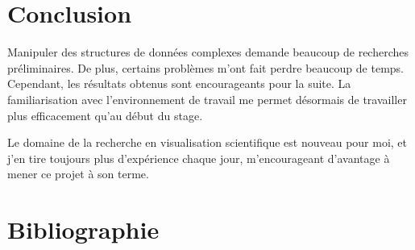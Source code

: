 \documentclass[12pt,a4paper,twoside]{article}
\begin{document}
    \section{Conclusion}                            %

    Manipuler des structures de données complexes demande beaucoup de recherches préliminaires. De plus, certains
    problèmes m'ont fait perdre beaucoup de temps.\\
    Cependant, les résultats obtenus sont encourageants pour la suite. La familiarisation avec l'environnement de travail
    me permet désormais de travailler plus efficacement qu'au début du stage.

    Le domaine de la recherche en visualisation scientifique est nouveau pour moi, et j'en tire toujours plus
    d'expérience chaque jour, m'encourageant d'avantage à mener ce projet à son terme.

    \newpage



    \newpage
    \section{Bibliographie}                         %

    
    \nocite{*}
\end{document}
